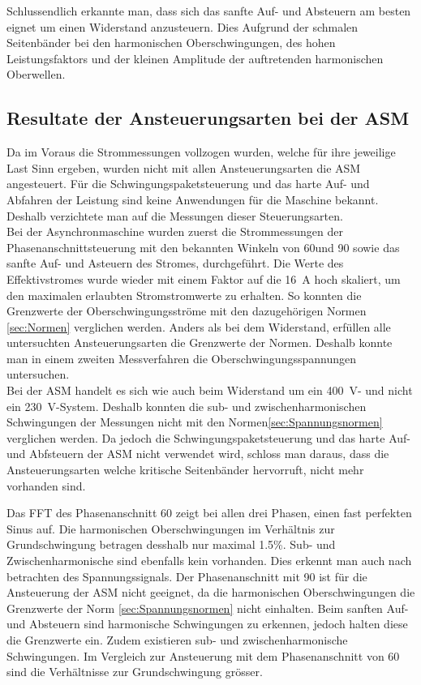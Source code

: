 Schlussendlich erkannte man, dass sich das sanfte Auf- und Absteuern am besten eignet um einen Widerstand anzusteuern. Dies Aufgrund der schmalen Seitenbänder bei den harmonischen Oberschwingungen, des hohen Leistungsfaktors und der kleinen Amplitude der auftretenden harmonischen Oberwellen. 

\subsection{Resultate der Ansteuerungsarten bei der ASM}
Da im Voraus die Strommessungen vollzogen wurden, welche für ihre jeweilige Last Sinn ergeben, wurden nicht mit allen Ansteuerungsarten die ASM angesteuert. Für die Schwingungspaketsteuerung und das harte Auf- und Abfahren der Leistung sind keine Anwendungen für die Maschine bekannt. Deshalb verzichtete man auf die Messungen dieser Steuerungsarten.\\

Bei der Asynchronmaschine wurden zuerst die Strommessungen der Phasenanschnittsteuerung mit den bekannten Winkeln von 60\textdegree und 90\textdegree \hspace{0.02cm} sowie das sanfte Auf- und Asteuern des Stromes, durchgeführt. Die Werte des Effektivstromes wurde wieder mit einem Faktor auf die \SI{16}{A} hoch skaliert, um den maximalen erlaubten Stromstromwerte zu erhalten. So konnten die Grenzwerte der Oberschwingungsströme mit den dazugehörigen Normen \ref{sec:Normen} verglichen werden. Anders als bei dem Widerstand, erfüllen alle untersuchten Ansteuerungsarten die Grenzwerte der Normen. Deshalb konnte man in einem zweiten Messverfahren die Oberschwingungsspannungen untersuchen.\\

Bei der ASM handelt es sich wie auch beim Widerstand um ein \SI{400}{V}- und nicht ein \SI{230}{V}-System. Deshalb konnten die sub- und zwischenharmonischen Schwingungen der Messungen nicht mit den Normen\ref{sec:Spannungsnormen} verglichen werden.
Da jedoch die Schwingungspaketsteuerung und das harte Auf- und Abfsteuern der ASM nicht verwendet wird, schloss man daraus, dass die Ansteuerungsarten welche kritische Seitenbänder hervorruft, nicht mehr vorhanden sind. 


Das FFT des Phasenanschnitt 60\textdegree \hspace{0.02cm} zeigt bei allen drei Phasen, einen fast perfekten Sinus auf.
Die harmonischen Oberschwingungen im Verhältnis zur Grundschwingung betragen desshalb nur maximal 1.5\%. Sub- und Zwischenharmonische sind ebenfalls kein vorhanden. Dies erkennt man auch nach betrachten des Spannungssignals.
Der Phasenanschnitt mit 90\textdegree \hspace{0.02cm} ist für die Ansteuerung der ASM nicht geeignet, da die harmonischen Oberschwingungen die Grenzwerte der Norm \ref{sec:Spannungsnormen} nicht einhalten. 
Beim sanften Auf- und Absteuern sind harmonische Schwingungen zu erkennen, jedoch halten diese die Grenzwerte ein. Zudem existieren sub- und zwischenharmonische Schwingungen. Im Vergleich zur Ansteuerung mit dem Phasenanschnitt von 60\textdegree \hspace{0.02cm} sind die Verhältnisse zur Grundschwingung grösser.\\ 

